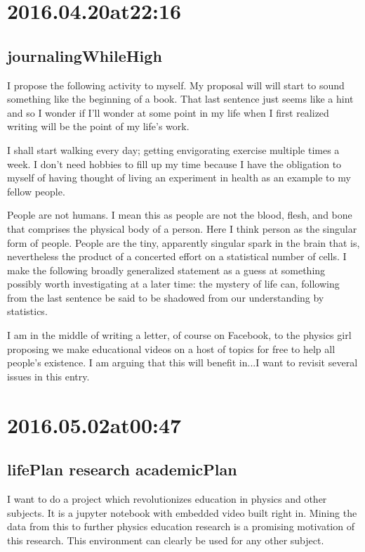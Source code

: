 \section*{ 2016.04.20at22:16 }
\subsection*{journalingWhileHigh}
I propose the following activity to myself. My proposal will will start to sound something like the beginning of a book. That last sentence just seems like a hint and so I wonder if I'll wonder at some point in my life when I first realized writing will be the point of my life's work.

I shall start walking every day; getting envigorating exercise multiple times a week. I don't need hobbies to fill up my time because I have the obligation to myself of having thought of living an experiment in health as an example to my fellow people.

People are not humans. I mean this as people are not the blood, flesh, and bone that comprises the physical body of a person. Here I think person as the singular form of people. People are the tiny, apparently singular spark in the brain that is, nevertheless the product of a concerted effort on a statistical number of cells. I make the following broadly generalized statement as a guess at something possibly worth investigating at a later time: the mystery of life can, following from the last sentence be said to be shadowed from our understanding by statistics.

I am in the middle of writing a letter, of course on Facebook, to the physics girl proposing we make educational videos on a host of topics for free to help all people's existence. I am arguing that this will benefit in...I want to revisit several issues in this entry. 

\section*{ 2016.05.02at00:47 }
\subsection*{ lifePlan research academicPlan }
I want to do a project which revolutionizes education in physics and other subjects. It is a jupyter notebook with embedded video built right in. Mining the data from this to further physics education research is a promising motivation of this research. This environment can clearly be used for any other subject.

